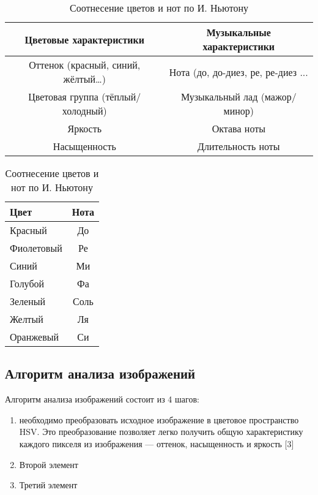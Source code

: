 	
	\begin{table}[ht]
		\centering
		\caption{Соотношение цветовых и музыкальных характеристик}
		\label{tab:color_music}
		\small 
		\begin{tabular}{|c|c|}
			\hline
			\textbf{Цветовые характеристики} & \textbf{Музыкальные характеристики} \\
			\hline
			Оттенок (красный, синий, жёлтый…) & Нота (до, до-диез, ре, ре-диез ... \\
			\hline
			Цветовая группа (тёплый/холодный) & Музыкальный лад (мажор/минор) \\
			\hline
			Яркость & Октава ноты \\
			\hline
			Насыщенность & Длительность ноты \\
			\hline
		\end{tabular}
		
		\vspace{1em} %
		
		\caption{Соотнесение цветов и нот по И. Ньютону}
		\label{tab:Newton}	
		\begin{tabular}{lc}
			\toprule
			\textbf{Цвет} & \textbf{Нота} \\
			\midrule
			Красный & До \\
			Фиолетовый & Ре \\
			Синий & Ми \\
			Голубой & Фа \\
			Зеленый & Соль \\
			Желтый & Ля \\
			Оранжевый & Си \\
			\bottomrule
		\end{tabular}
	\end{table}


		
	\subsection {Алгоритм анализа изображений}
		Алгоритм анализа изображений состоит из 4 шагов:
		\begin{enumerate}
			\item необходимо преобразовать исходное изображение в цветовое пространство HSV. Это преобразование позволяет легко получить общую характеристику каждого пикселя из изображения — оттенок, насыщенность и яркость [3]
		
			\item Второй элемент
			\item Третий элемент
		\end{enumerate}